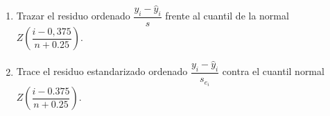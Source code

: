 \begin{enumerate}[(1)]
    \item Trazar el residuo ordenado $\dfrac{y_i-\hat{y}_i}{s}$ frente al cuantil de la normal $Z\left(\dfrac{i-0,375}{n+0.25}\right)$.
    \item Trace el residuo estandarizado ordenado $\dfrac{y_i-\hat{y}_i}{s_{e_i}}$ contra el cuantil normal $Z\left(\dfrac{i-0.375}{n+0.25}\right)$.
\end{enumerate}
